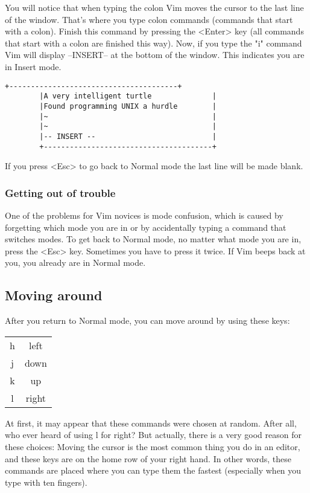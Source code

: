 You will notice that when typing the colon Vim moves the cursor to the last line of the window.
That's where you type colon commands (commands that start with a colon).
Finish this command by pressing the <Enter> key (all commands that start with a colon are finished this way).
Now, if you type the "i" command Vim will display --INSERT-- at the bottom of the window.
This indicates you are in Insert mode.

		\begin{Verbatim}[samepage=true]
		+---------------------------------------+
		|A very intelligent turtle              |
		|Found programming UNIX a hurdle        |
		|~                                      |
		|~                                      |
		|-- INSERT --                           |
		+---------------------------------------+
		\end{Verbatim}

If you press <Esc> to go back to Normal mode the last line will be made blank.

\subsubsection{Getting out of trouble}

One of the problems for Vim novices is mode confusion, which is caused by forgetting which mode you are in or by accidentally typing a command that switches modes.
To get back to Normal mode, no matter what mode you are in, press the <Esc> key.
Sometimes you have to press it twice.
If Vim beeps back at you, you already are in Normal mode.

\subsection{Moving around}

After you return to Normal mode, you can move around by using these keys:
\label{hjlk}
\begin{center}
				\begin{tabular}{c|c} 
								h & left\\
								j & down\\
								k & up\\
								l & right
				\end{tabular}
\end{center}

At first, it may appear that these commands were chosen at random.
After all, who ever heard of using l for right?  But actually, there is a very good reason for these choices: Moving the cursor is the most common thing you do in an editor, and these keys are on the home row of your right hand.
In other words, these commands are placed where you can type them the fastest (especially when you type with ten fingers).


